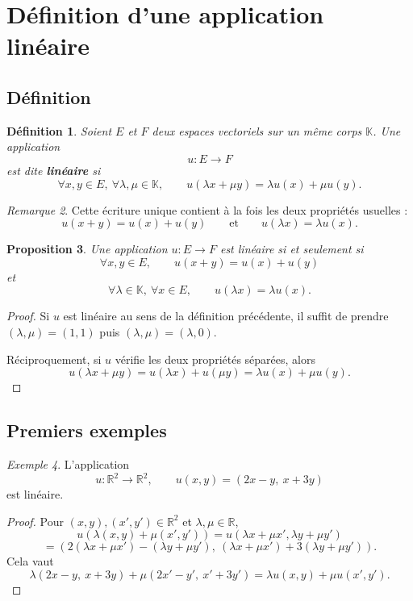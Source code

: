 \documentclass[11pt,a4paper]{article}
\newtheorem{definition}{Définition}[section]
\newtheorem{proposition}[definition]{Proposition}
\theoremstyle{remark}
\newtheorem{remarque}[definition]{Remarque}
\newtheorem{exemple}[definition]{Exemple}
\newcommand{\R}{\mathbb{R}}
\newcommand{\K}{\mathbb{K}}
\begin{document}
\section{Définition d’une application linéaire}

\subsection{Définition}

\begin{definition}
Soient \(E\) et \(F\) deux espaces vectoriels sur un même corps \(\K\).  
Une application
\[
u:E\to F
\]
est dite \textbf{linéaire} si
\[
\forall x,y\in E,\ \forall \lambda,\mu\in\K,\qquad
u(\lambda x+\mu y)=\lambda u(x)+\mu u(y).
\]
\end{definition}

\begin{remarque}
Cette écriture unique contient à la fois les deux propriétés usuelles :
\[
u(x+y)=u(x)+u(y)
\qquad \text{et} \qquad
u(\lambda x)=\lambda u(x).
\]
\end{remarque}

\begin{proposition}
Une application \(u:E\to F\) est linéaire si et seulement si
\[
\forall x,y\in E,\qquad u(x+y)=u(x)+u(y)
\]
et
\[
\forall \lambda\in\K,\ \forall x\in E,\qquad u(\lambda x)=\lambda u(x).
\]
\end{proposition}

\begin{proof}
Si \(u\) est linéaire au sens de la définition précédente, il suffit de prendre \((\lambda,\mu)=(1,1)\) puis \((\lambda,\mu)=(\lambda,0)\).

Réciproquement, si \(u\) vérifie les deux propriétés séparées, alors
\[
u(\lambda x+\mu y)=u(\lambda x)+u(\mu y)=\lambda u(x)+\mu u(y).
\]
\end{proof}

\subsection{Premiers exemples}

\begin{exemple}
L’application
\[
u:\R^2\to\R^2,\qquad u(x,y)=(2x-y,\ x+3y)
\]
est linéaire.
\end{exemple}

\begin{proof}
Pour \((x,y),(x',y')\in\R^2\) et \(\lambda,\mu\in\R\),
\[
u(\lambda(x,y)+\mu(x',y'))
=
u(\lambda x+\mu x',\lambda y+\mu y')
\]
\[
=
(2(\lambda x+\mu x')-(\lambda y+\mu y'),\ (\lambda x+\mu x')+3(\lambda y+\mu y')).
\]
Cela vaut
\[
\lambda(2x-y,\ x+3y)+\mu(2x'-y',\ x'+3y')
=
\lambda u(x,y)+\mu u(x',y').
\]
\end{proof}
\end{document}
